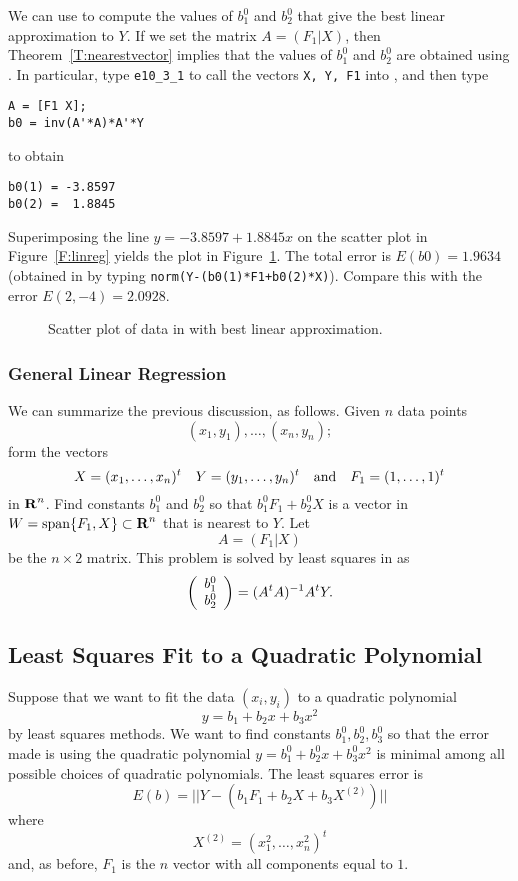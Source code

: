 We can use \Matlab to compute the values of $b_1^0$ and $b_2^0$ that give the
best linear approximation to $Y$.  If we set the matrix $A=(F_1|X)$, then
Theorem~\ref{T:nearestvector} implies that the values of $b_1^0$ and $b_2^0$
are obtained using .  In particular, type {\tt e10\_3\_1}
to call the vectors {\tt X, Y, F1} into \Matlabp, and then type
\begin{verbatim}
A = [F1 X];
b0 = inv(A'*A)*A'*Y
\end{verbatim}
to obtain
\begin{verbatim}
b0(1) = -3.8597
b0(2) =  1.8845
\end{verbatim}
Superimposing the line $y=-3.8597+1.8845x$ on the
scatter plot in
Figure~\ref{F:linreg} yields the plot in Figure~\ref{F:linreg2}.
The total error is $E(b0)=1.9634$ (obtained in \Matlab by typing
{\tt norm(Y-(b0(1)*F1+b0(2)*X)}).
Compare this with the error
$E(2,-4)=2.0928$.
\begin{figure}[htb]
     \centerline{%
     }
     \caption{Scatter plot of data in \protect{} with best
	linear approximation.}
     \label{F:linreg2}
\end{figure}

\subsubsection*{General Linear Regression}

We can summarize the previous discussion, as follows.  Given $n$ data points
\[
(x_1,y_1),\ldots, (x_n,y_n);
\]
form the vectors
\[
X=(x_1,\ldots,x_n)^t \quad Y=(y_1,\ldots,y_n)^t \quad\mbox{and}\quad F_1=(1,\ldots,1)^t
\]
in $\mbox{$\bf{R}$}^n$.  Find constants $b_1^0$ and $b_2^0$ so that $b_1^0F_1+b_2^0X$ is
a vector in $W={\rm span}\{F_1,X\}\subset\mbox{$\bf{R}$}^n$ that is nearest to $Y$.  Let
\[
A=(F_1|X)
\]
be the $n\times 2$ matrix.  This problem is solved by least squares in
 as
\begin{equation}  \label{E:LSlinfit}
\left(\begin{array}{r} b_1^0 \\ b_2^0\end{array}\right) = (A^tA)^{-1} A^tY.
\end{equation}


\subsection*{Least Squares Fit to a Quadratic Polynomial}

Suppose that we want to fit the data $(x_i,y_i)$ to a quadratic polynomial
\[
y=b_1+b_2x+b_3x^2
\]
by least squares methods.  We want to find constants $b_1^0,b_2^0,b_3^0$ so
that the error made is using the quadratic polynomial $y=b_1^0+b_2^0x+b_3^0x^2$
is minimal among all possible choices of quadratic polynomials.  The least
squares error is
\[
E(b) = ||Y-\left(b_1F_1+b_2X+b_3X^{(2)}\right)||
\]
where
\[
X^{(2)}=\left(x_1^2,\ldots,x_n^2\right)^t
\]
and, as before, $F_1$ is the $n$ vector with all components equal to $1$.


